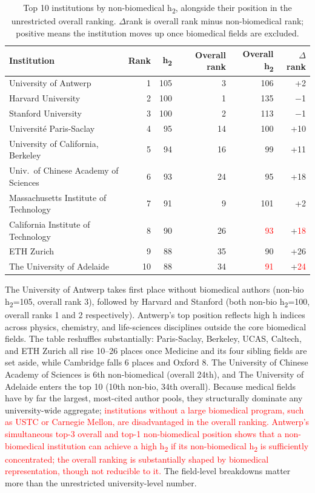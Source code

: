 \begin{table}[h]
	\centering
	\caption{Top 10 institutions by non-biomedical h\textsubscript{2}, alongside their position in the unrestricted overall ranking. $\Delta$rank is overall rank minus non-biomedical rank; positive means the institution moves up once biomedical fields are excluded.}
	\label{tab:nonbio}
	\begin{tabular}{@{}lrrrrr@{}}
	\toprule
	Institution & Rank & h\textsubscript{2} & Overall rank & Overall h\textsubscript{2} & $\Delta$rank \\
	\midrule
	University of Antwerp & 1 & 105 & 3 & 106 & +2 \\
	Harvard University & 2 & 100 & 1 & 135 & $-$1 \\
	Stanford University & 3 & 100 & 2 & 113 & $-$1 \\
	Université Paris-Saclay & 4 & 95 & 14 & 100 & +10 \\
	University of California, Berkeley & 5 & 94 & 16 & 99 & +11 \\
	Univ.\ of Chinese Academy of Sciences & 6 & 93 & 24 & 95 & +18 \\
	Massachusetts Institute of Technology & 7 & 91 & 9 & 101 & +2 \\
	California Institute of Technology & 8 & 90 & 26 & \textcolor{red}{93} & +\textcolor{red}{18} \\
	ETH Zurich & 9 & 88 & 35 & 90 & +26 \\
	The University of Adelaide & 10 & 88 & 34 & \textcolor{red}{91} & +\textcolor{red}{24} \\
	\bottomrule
	\end{tabular}
\end{table}

The University of Antwerp takes first place without biomedical authors (non-bio h\textsubscript{2}=105, overall rank 3), followed by Harvard and Stanford (both non-bio h\textsubscript{2}=100, overall ranks 1 and 2 respectively). Antwerp's top position reflects high h indices across physics, chemistry, and life-sciences disciplines outside the core biomedical fields. The table reshuffles substantially: Paris-Saclay, Berkeley, UCAS, Caltech, and ETH Zurich all rise 10--26 places once Medicine and its four sibling fields are set aside, while Cambridge falls 6 places and Oxford 8. The University of Chinese Academy of Sciences is 6th non-biomedical (overall 24th), and The University of Adelaide enters the top 10 (10th non-bio, 34th overall). Because medical fields have by far the largest, most-cited author pools, they structurally dominate any university-wide aggregate; \textcolor{red}{institutions without a large biomedical program, such as USTC or Carnegie Mellon, are disadvantaged in the overall ranking. Antwerp's simultaneous top-3 overall and top-1 non-biomedical position shows that a non-biomedical institution can achieve a high h\textsubscript{2} if its non-biomedical h\textsubscript{2} is sufficiently concentrated; the overall ranking is substantially shaped by biomedical representation, though not reducible to it.} The field-level breakdowns matter more than the unrestricted university-level number.

